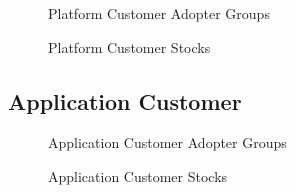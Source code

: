 	\begin{figure}[htb]
		\centering
		
		\caption{Platform Customer Adopter Groups}
	\end{figure}

	\begin{figure}[htb]
		\centering
		
		\caption{Platform Customer Stocks}
	\end{figure}

	\newpage
	\subsection{Application Customer}\label{ch:app05:cs:ac}
	
	\begin{figure}[htb]
		\centering
		
		\caption{Application Customer Adopter Groups}
	\end{figure}

	\begin{figure}[htb]
		\centering
		
		\caption{Application Customer Stocks}
	\end{figure}